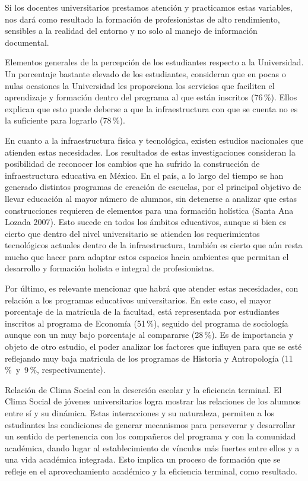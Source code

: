  
Si los docentes universitarios prestamos atención y practicamos estas
variables, nos dará como resultado la formación de profesionistas de alto
rendimiento, sensibles a la realidad del entorno y no solo al manejo de
información documental.

 
Elementos generales de la percepción de los estudiantes respecto a la
Universidad. Un porcentaje bastante elevado de los estudiantes, consideran
que en pocas o nulas ocasiones la Universidad les proporciona los servicios
 que faciliten el aprendizaje y formación dentro del programa al que están
inscritos (76\,\%). Ellos explican que esto puede deberse a que la
infraestructura con que se cuenta no es la suficiente para lograrlo
(78\,\%).

 
En cuanto a la infraestructura física y tecnológica, existen estudios
nacionales que atienden estas necesidades. Los resultados de estas
investigaciones consideran la posibilidad de reconocer los cambios que ha
sufrido la construcción de infraestructura educativa en México. En el país,
a lo largo del tiempo se han generado distintos programas de creación de
escuelas, por el principal objetivo de llevar educación al mayor número de
alumnos, sin detenerse  a analizar que estas construcciones requieren de
elementos para una formación holística (Santa Ana Lozada 2007). Esto
sucede en todos los ámbitos educativos, aunque si bien es cierto que dentro
del nivel universitario se atienden los requerimientos tecnológicos
actuales dentro de la infraestructura, también es cierto que aún resta
mucho que hacer para adaptar estos espacios hacia ambientes que permitan el
desarrollo y formación holista e integral de profesionistas.

 
Por último, es relevante mencionar que habrá que atender estas necesidades,
con relación a los programas educativos universitarios. En este caso, el
mayor porcentaje de la matrícula de la facultad, está representada por
estudiantes inscritos al programa de Economía (51\,\%), seguido del programa
de sociología aunque con un muy bajo porcentaje al compararse (28\,\%). Es de
importancia y objeto de otro estudio, el poder analizar los factores que
influyen para que se esté reflejando muy baja matricula de los programas de
Historia y Antropología (11\,\%~y~9\,\%, respectivamente).
\enlargethispage{1\baselineskip}

 
Relación de Clima Social con la deserción escolar y la eficiencia terminal.
El Clima Social de jóvenes universitarios logra mostrar las relaciones de
los alumnos entre sí y su dinámica. Estas interacciones y su naturaleza,
permiten a los estudiantes las condiciones de generar mecanismos para
perseverar y desarrollar un sentido de pertenencia con los compañeros del
programa y con la comunidad académica, dando lugar al establecimiento de
vínculos más fuertes entre ellos y a una vida académica integrada. Esto
implica un proceso de formación que se refleje en el aprovechamiento
académico y la eficiencia terminal, como resultado.

